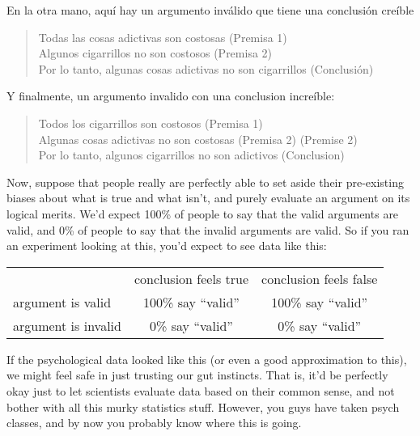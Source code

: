 En la otra mano, aquí hay un argumento inválido que tiene una conclusión creíble
\begin{quote}
Todas las cosas adictivas son costosas (Premisa 1)\\
Algunos cigarrillos no son costosos (Premisa 2)\\
Por lo tanto, algunas cosas adictivas no son cigarrillos (Conclusión)
\end{quote}
Y finalmente, un argumento invalido con una conclusion increíble:
\begin{quote}
Todos los cigarrillos son costosos (Premisa 1)\\
Algunas cosas adictivas no son costosas (Premisa 2) (Premise 2)\\
Por lo tanto, algunos cigarrillos no son adictivos (Conclusion)
\end{quote}
Now, suppose that people really are perfectly able to set aside their pre-existing biases about what is true and what isn't, and purely evaluate an argument on its logical merits. We'd expect 100\% of people to say that the valid arguments are valid, and 0\% of people to say that the invalid arguments are valid. So if you ran an experiment looking at this, you'd expect to see data like this:

\begin{center}
\renewcommand{\arraystretch}{1.5}
\begin{tabular}{l|cc|}
\multicolumn{1}{c}{} & \multicolumn{1}{c}{conclusion feels true} & \multicolumn{1}{c}{conclusion feels false} \\ \cline{2-3}
argument is valid   & 100\% say ``valid'' & 100\%  say ``valid''\\ 
argument is invalid &  0\% say ``valid''& 0\% say ``valid''\\ \cline{2-3}
\end{tabular}
\end{center}

\noindent
If the psychological data looked like this (or even a good approximation to this), we might feel safe in just trusting our gut instincts. That is, it'd be perfectly okay just to let scientists evaluate data based on their common sense, and not bother with all this murky statistics stuff. However, you guys have taken psych classes, and by now you probably know where this is going.

